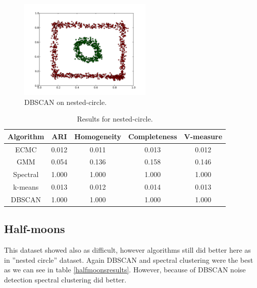 \documentclass[conference]{IEEEtran}
\begin{document}
\begin{figure}[th]
\centering
\includegraphics[width=15pc]{dbscan_circle-weird.pdf}
\caption{DBSCAN on nested-circle.}
\label{DBSCAN_circleweird}
\end{figure}

\begin{table}[htbp]
\caption{Results for nested-circle.}
\label{circleweirdresults}
\begin{center}
\setlength{\tabcolsep}{3pt}
\begin{tabular}{ |c|c|c|c|c| }
\hline
	\bf Algorithm & \bf ARI & \bf Homogeneity & \bf Completeness & \bf V-measure\\ \hline
	
	ECMC & 0.012 & 0.011 & 0.013 & 0.012 \\ \hline
	GMM & 0.054 & 0.136 & 0.158 & 0.146 \\ \hline
	Spectral & 1.000 & 1.000 & 1.000 & 1.000 \\ \hline
	k-means & 0.013 & 0.012 & 0.014 & 0.013 \\ \hline
	DBSCAN & 1.000 & 1.000 & 1.000 & 1.000 \\ \hline
\end{tabular}
\end{center}
\end{table}


\subsection{Half-moons}

This dataset showed also as difficult, however algorithms still did better here as in ''nested circle'' dataset. Again
DBSCAN and spectral clustering were the best as we can see in table \ref{halfmoonsresults}. However, because of
DBSCAN noise detection spectral clustering did better.
\end{document}
